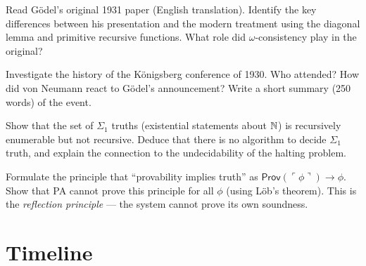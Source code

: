 \begin{exercise}[Research]
Read Gödel's original 1931 paper (English translation). Identify the key differences between his presentation and the modern treatment using the diagonal lemma and primitive recursive functions. What role did $\omega$-consistency play in the original?
\end{exercise}

\begin{exercise}[Research]
Investigate the history of the Königsberg conference of 1930. Who attended? How did von Neumann react to Gödel's announcement? Write a short summary (250 words) of the event.
\end{exercise}

\begin{exercise}[Challenge]
Show that the set of $\Sigma_1$ truths (existential statements about $\mathbb{N}$) is recursively enumerable but not recursive. Deduce that there is no algorithm to decide $\Sigma_1$ truth, and explain the connection to the undecidability of the halting problem.
\end{exercise}

\begin{exercise}[Challenge]
Formulate the principle that ``provability implies truth'' as $\mathsf{Prov}(\ulcorner \phi \urcorner) \to \phi$. Show that PA cannot prove this principle for all $\phi$ (using Löb's theorem). This is the \emph{reflection principle} --- the system cannot prove its own soundness.
\end{exercise}

\section{Timeline}
\label{sec:godel:timeline}

